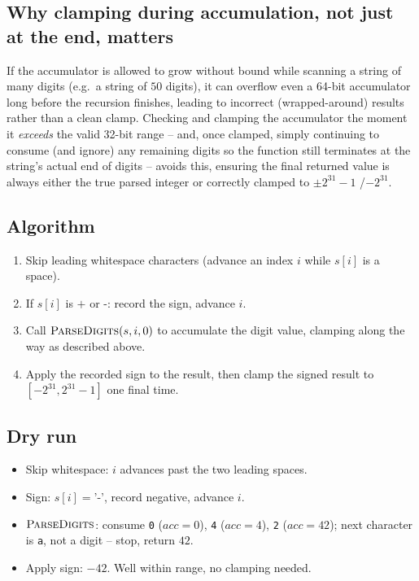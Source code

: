 \subsection*{Why clamping during accumulation, not just at the end, matters}

If the accumulator is allowed to grow without bound while scanning a
string of many digits (e.g.\ a string of $50$ digits), it can overflow
even a 64-bit accumulator long before the recursion finishes, leading to
incorrect (wrapped-around) results rather than a clean clamp. Checking
and clamping the accumulator the moment it \emph{exceeds} the valid
32-bit range -- and, once clamped, simply continuing to consume (and
ignore) any remaining digits so the function still terminates at the
string's actual end of digits -- avoids this, ensuring the final
returned value is always either the true parsed integer or correctly
clamped to $\pm 2^{31}{-}1$ /$-2^{31}$.

\subsection*{Algorithm}

\begin{enumerate}
  \item Skip leading whitespace characters (advance an index $i$ while
        $s[i]$ is a space).
  \item If $s[i]$ is $\texttt{+}$ or $\texttt{-}$: record the sign,
        advance $i$.
  \item Call $\textsc{ParseDigits}(s, i, 0)$ to accumulate the digit
        value, clamping along the way as described above.
  \item Apply the recorded sign to the result, then clamp the
        signed result to $[-2^{31}, 2^{31}-1]$ one final time.
\end{enumerate}

\subsection*{Dry run}


\begin{itemize}
  \item Skip whitespace: $i$ advances past the two leading spaces.
  \item Sign: $s[i]=\texttt{'-'}$, record negative, advance $i$.
  \item $\textsc{ParseDigits}$: consume \texttt{0} ($\textit{acc}=0$),
        \texttt{4} ($\textit{acc}=4$), \texttt{2} ($\textit{acc}=42$);
        next character is \texttt{a}, not a digit -- stop, return $42$.
  \item Apply sign: $-42$. Well within range, no clamping needed.
\end{itemize}

